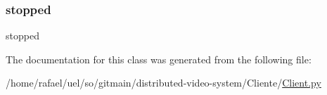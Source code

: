 \subsubsection{\texorpdfstring{stopped}{stopped}}
{\footnotesize\ttfamily stopped}



The documentation for this class was generated from the following file\+:\begin{DoxyCompactItemize}
\item 
/home/rafael/uel/so/gitmain/distributed-\/video-\/system/\+Cliente/\hyperlink{_client_8py}{Client.\+py}\end{DoxyCompactItemize}
